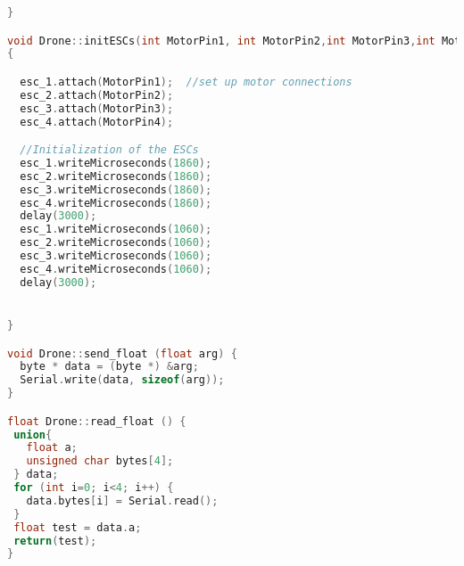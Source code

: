 \begin{lstlisting}[language=C,caption={Drone.cpp Arduino Library File},label={lst:Drone.cpp}]
}

void Drone::initESCs(int MotorPin1, int MotorPin2,int MotorPin3,int MotorPin4)
{

  esc_1.attach(MotorPin1);  //set up motor connections
  esc_2.attach(MotorPin2);
  esc_3.attach(MotorPin3);
  esc_4.attach(MotorPin4);

  //Initialization of the ESCs
  esc_1.writeMicroseconds(1860);
  esc_2.writeMicroseconds(1860);
  esc_3.writeMicroseconds(1860);
  esc_4.writeMicroseconds(1860);
  delay(3000);
  esc_1.writeMicroseconds(1060);
  esc_2.writeMicroseconds(1060);
  esc_3.writeMicroseconds(1060);
  esc_4.writeMicroseconds(1060);
  delay(3000);


}

void Drone::send_float (float arg) {
  byte * data = (byte *) &arg;
  Serial.write(data, sizeof(arg));
}

float Drone::read_float () {
 union{
   float a;
   unsigned char bytes[4];
 } data;
 for (int i=0; i<4; i++) {
   data.bytes[i] = Serial.read();
 }
 float test = data.a;
 return(test);
}


\end{lstlisting}



